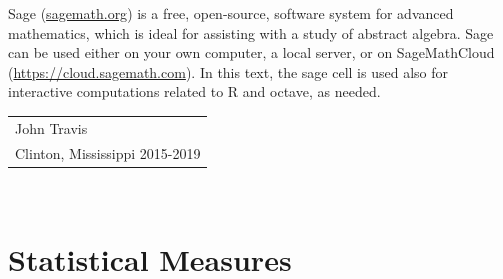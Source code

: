 \documentclass[10pt,]{book}
\numberwithin{equation}{section}
\begin{document}
\par
\hypertarget{p-9}{}%
Sage (\href{http://sagemath.org}{sagemath.org}) is a free, open-source, software system for advanced mathematics, which is ideal for assisting with a study of abstract algebra. Sage can be used either on your own computer, a local server, or on SageMathCloud (\href{https://cloud.sagemath.com}{https://cloud.sagemath.com}).  In this text, the sage cell is used also for interactive computations related to R and octave, as needed.%
\par\hfill\begin{tabular}{l@{}}
John Travis\\
Clinton, Mississippi 2015-2019
\end{tabular}\\\par
\setcounter{tocdepth}{1}
\renewcommand*\contentsname{Contents}
\tableofcontents
\mainmatter
%
%
\typeout{************************************************}
\typeout{************************************************}
%
\chapter[{Statistical Measures}]{Statistical Measures}\label{RepresentingData}
%
%
\typeout{************************************************}
\typeout{************************************************}
%
\end{document}
